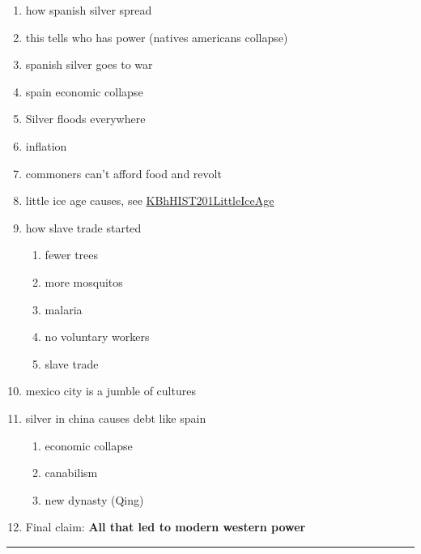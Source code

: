 \documentclass[letterpaper]{article}
\begin{document}
\begin{enumerate}
\item how spanish silver spread
\item this tells who has power (natives americans collapse)
\item spanish silver goes to war
\item spain economic collapse
\item Silver floods everywhere
\item inflation
\item commoners can't afford food and revolt
\item little ice age causes, see
\href{KBhHIST201LittleIceAge.org}{KBhHIST201LittleIceAge}
\item how slave trade started

\begin{enumerate}
\item fewer trees
\item more mosquitos
\item malaria
\item no voluntary workers
\item slave trade
\end{enumerate}

\item mexico city is a jumble of cultures
\item silver in china causes debt like spain

\begin{enumerate}
\item economic collapse
\item canabilism
\item new dynasty (Qing)
\end{enumerate}

\item Final claim: \textbf{All that led to modern western power}
\end{enumerate}

\noindent\rule{\textwidth}{0.5pt}
\end{document}
